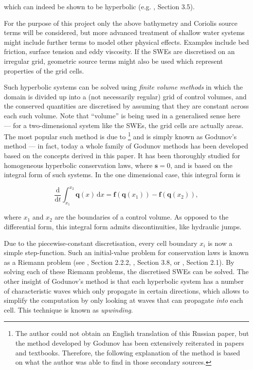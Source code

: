 \documentclass[a4paper,onecolumn,11pt]{article}
\renewcommand{\vec}[1]{\ensuremath{\mathbf{#1}}}
\newcommand{\dif}{\mathrm{d}}
\begin{document}
which can indeed be shown to be hyperbolic (e.g. \citet{toro2001shock}, Section 3.5).

For the purpose of this project only the above bathymetry and Coriolis source terms will be considered, but more advanced treatment of shallow water systems might include further terms to model other physical effects. Examples include bed friction, surface tension and eddy viscosity. If the SWEs are discretised on an irregular grid, geometric source terms might also be used which represent properties of the grid cells.

Such hyperbolic systems can be solved using \emph{finite volume methods} in which the domain is divided up into a (not necessarily regular) grid of control volumes, and the conserved quantities are discretised by assuming that they are constant across each such volume. Note that ``volume'' is being used in a generalised sense here --- for a two-dimensional system like the SWEs, the grid cells are actually areas. The most popular such method is due to \citet{godunov1959difference}\footnote{The author could not obtain an English translation of this Russian paper, but the method developed by Godunov has been extensively reiterated in papers and textbooks. Therefore, the following explanation of the method is based on what the author was able to find in those secondary sources.} and is simply known as Godunov's method --- in fact, today a whole family of Godunov methods has been developed based on the concepts derived in this paper. It has been thoroughly studied for homogeneous hyperbolic conservation laws, where $\vec{s} = 0$, and is based on the integral form of such systems. In the one dimensional case, this integral form is

$$
    \frac{\dif}{\dif t} \int_{x_1}^{x_2} \vec{q}(x)\,\dif x = \vec{f}(\vec{q}(x_1)) - \vec{f}(\vec{q}(x_2)),
$$

where $x_1$ and $x_2$ are the boundaries of a control volume. As opposed to the differential form, this integral form admits discontinuities, like hydraulic jumps.

Due to the piecewise-constant discretisation, every cell boundary $x_i$ is now a simple step-function. Such an initial-value problem for conservation laws is known as a Riemann problem (see \citet{toro1999riemann}, Section 2.2.2, \citet{leveque2002finite}, Section 3.8, or \citet{toro2007godunov}, Section 2.1). By solving each of these Riemann problems, the discretised SWEs can be solved. The other insight of Godunov's method is that each hyperbolic system has a number of characteristic waves which only propagate in certain directions, which allows to simplify the computation by only looking at waves that can propagate \emph{into} each cell. This technique is known as \emph{upwinding}.
\end{document}

